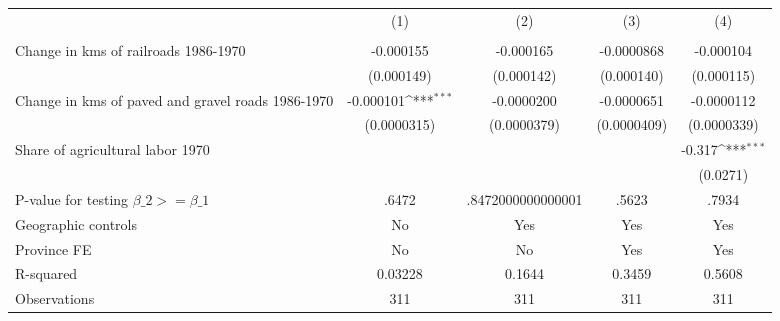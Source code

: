 {
\def\sym#1{\ifmmode^{#1}\else\(^{#1}\)\fi}
\begin{tabular}{l*{4}{c}}
\hline\hline
                &\multicolumn{1}{c}{(1)}&\multicolumn{1}{c}{(2)}&\multicolumn{1}{c}{(3)}&\multicolumn{1}{c}{(4)}\\
                &\multicolumn{1}{c}{}&\multicolumn{1}{c}{}&\multicolumn{1}{c}{}&\multicolumn{1}{c}{}\\
\hline
Change in kms of railroads 1986-1970&-0.000155         &-0.000165         &-0.0000868         &-0.000104         \\
                &(0.000149)         &(0.000142)         &(0.000140)         &(0.000115)         \\
[1em]
Change in kms of paved and gravel roads 1986-1970&-0.000101\sym{***}&-0.0000200         &-0.0000651         &-0.0000112         \\
                &(0.0000315)         &(0.0000379)         &(0.0000409)         &(0.0000339)         \\
[1em]
Share of agricultural labor 1970&                  &                  &                  &   -0.317\sym{***}\\
                &                  &                  &                  & (0.0271)         \\
\hline
P-value for testing $\beta\_{2} >= \beta\_{1}$&    .6472         &.8472000000000001         &    .5623         &    .7934         \\
Geographic controls&       No         &      Yes         &      Yes         &      Yes         \\
Province FE     &       No         &       No         &      Yes         &      Yes         \\
R-squared       &  0.03228         &   0.1644         &   0.3459         &   0.5608         \\
Observations    &      311         &      311         &      311         &      311         \\
\hline\hline
\end{tabular}
}
